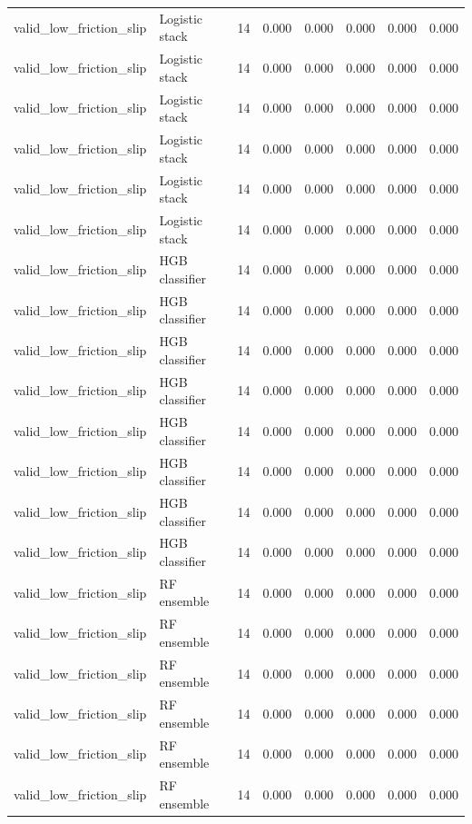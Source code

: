 {\begin{longtable}{llrrrrrr}
valid\_low\_friction\_slip & Logistic stack & 14 & 0.000 & 0.000 & 0.000 & 0.000 & 0.000 \\
valid\_low\_friction\_slip & Logistic stack & 14 & 0.000 & 0.000 & 0.000 & 0.000 & 0.000 \\
valid\_low\_friction\_slip & Logistic stack & 14 & 0.000 & 0.000 & 0.000 & 0.000 & 0.000 \\
valid\_low\_friction\_slip & Logistic stack & 14 & 0.000 & 0.000 & 0.000 & 0.000 & 0.000 \\
valid\_low\_friction\_slip & Logistic stack & 14 & 0.000 & 0.000 & 0.000 & 0.000 & 0.000 \\
valid\_low\_friction\_slip & Logistic stack & 14 & 0.000 & 0.000 & 0.000 & 0.000 & 0.000 \\
valid\_low\_friction\_slip & HGB classifier & 14 & 0.000 & 0.000 & 0.000 & 0.000 & 0.000 \\
valid\_low\_friction\_slip & HGB classifier & 14 & 0.000 & 0.000 & 0.000 & 0.000 & 0.000 \\
valid\_low\_friction\_slip & HGB classifier & 14 & 0.000 & 0.000 & 0.000 & 0.000 & 0.000 \\
valid\_low\_friction\_slip & HGB classifier & 14 & 0.000 & 0.000 & 0.000 & 0.000 & 0.000 \\
valid\_low\_friction\_slip & HGB classifier & 14 & 0.000 & 0.000 & 0.000 & 0.000 & 0.000 \\
valid\_low\_friction\_slip & HGB classifier & 14 & 0.000 & 0.000 & 0.000 & 0.000 & 0.000 \\
valid\_low\_friction\_slip & HGB classifier & 14 & 0.000 & 0.000 & 0.000 & 0.000 & 0.000 \\
valid\_low\_friction\_slip & HGB classifier & 14 & 0.000 & 0.000 & 0.000 & 0.000 & 0.000 \\
valid\_low\_friction\_slip & RF ensemble & 14 & 0.000 & 0.000 & 0.000 & 0.000 & 0.000 \\
valid\_low\_friction\_slip & RF ensemble & 14 & 0.000 & 0.000 & 0.000 & 0.000 & 0.000 \\
valid\_low\_friction\_slip & RF ensemble & 14 & 0.000 & 0.000 & 0.000 & 0.000 & 0.000 \\
valid\_low\_friction\_slip & RF ensemble & 14 & 0.000 & 0.000 & 0.000 & 0.000 & 0.000 \\
valid\_low\_friction\_slip & RF ensemble & 14 & 0.000 & 0.000 & 0.000 & 0.000 & 0.000 \\
valid\_low\_friction\_slip & RF ensemble & 14 & 0.000 & 0.000 & 0.000 & 0.000 & 0.000 \\

\end{longtable}}
